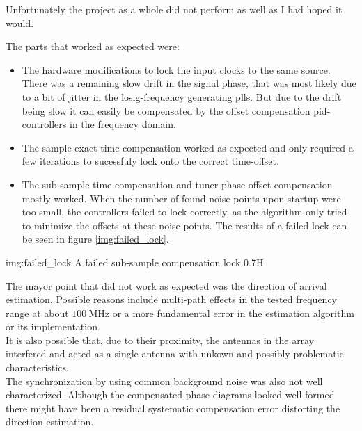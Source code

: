 
Unfortunately the project as a whole did not
perform as well as I had hoped it would.

\noindent
The parts that worked as expected were:

\begin{itemize}
  \item
    The hardware modifications to lock the input clocks
    to the same source. \\
    There was a remaining slow drift in
    the signal phase, that was most likely due to a bit of jitter
    in the \acrshort{losig}-frequency generating \glspl{pll}.
    But due to the drift being slow it can easily be compensated by
    the offset compensation \acrshort{pid}-controllers in the frequency domain.

  \item
    The sample-exact time compensation worked as expected and
    only required a few iterations to sucessfuly lock onto
    the correct time-offset.

  \item
    The sub-sample time compensation and tuner phase
    offset compensation mostly worked.
    When the number of found noise-points upon startup
    were too small, the controllers failed to lock
    correctly, as the algorithm only tried to minimize the
    offsets at these noise-points.
    The results of a failed lock can be seen in figure
    \ref{img:failed_lock}.
\end{itemize}

             {img:failed_lock}
             {A failed sub-sample compensation lock}
             {0.7}{H}

\newpage

The mayor point that did not work as expected was the direction
of arrival estimation. Possible reasons include
multi-path effects in the tested frequency range
at about $\SI{100}{\mega\hertz}$ or a more
fundamental error in the estimation algorithm
or its implementation. \\

It is also possible that, due to their proximity,
the antennas in the array interfered and acted
as a single antenna with unkown and
possibly problematic characteristics. \\

The synchronization by using common background noise
was also not well characterized.
Although the compensated phase diagrams looked well-formed
there might have been a residual systematic
compensation error distorting the direction estimation.

